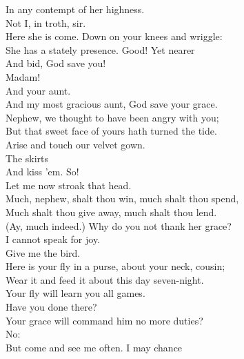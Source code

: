\documentclass[a4paper,oneside,12pt]{memoir}
\begin{document}
\begin{drama*}
In any contempt of her highness.\\
\dapperspeaks {} Not I, in troth, sir.\\
\subtlespeaks Here she is come. Down on your knees and wriggle:\\
She has a stately presence. Good! Yet nearer\\
And bid, God save you!\\
\dapperspeaks {} Madam!\\
\subtlespeaks {} And your aunt.\\
\dapperspeaks And my most gracious aunt, God save your grace.\\
\dolspeaks Nephew, we thought to have been angry with you;\\
But that sweet face of yours hath turned the tide.\\
Arise and touch our velvet gown.\\
\subtlespeaks {} The skirts\\
And kiss 'em. So!\\
\dolspeaks {} Let me now stroak that head.\\
Much, nephew, shalt thou win, much shalt thou spend,\\
Much shalt thou give away, much shalt thou lend.\\
\subtlespeaks (Ay, much indeed.) Why do you not thank her grace?\\
\dapperspeaks I cannot speak for joy.\\
\dolspeaks {} Give me the bird.\\
Here is your fly in a purse, about your neck, cousin;\\
Wear it and feed it about this day seven-night.\\
\subtlespeaks Your fly will learn you all games.\\
\facespeaks {}  Have you done there?\\
\subtlespeaks Your grace will command him no more duties?\\
\dolspeaks {} No:\\
But come and see me often. I may chance\\

\end{drama*}
\end{document}

